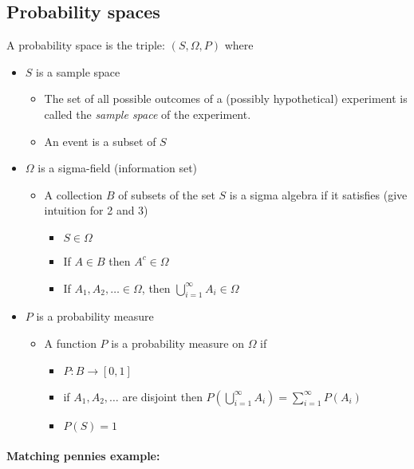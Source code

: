 \subsection{Probability spaces}
\label{sec-1-2}

     A probability space is the triple: $(S, \Omega, P)$ where
\begin{itemize}
\item $S$ is a sample space
\begin{itemize}
\item The set of all possible outcomes of a (possibly hypothetical)
         experiment is called the \emph{sample space} of the experiment.
\item An event is a subset of $S$
\end{itemize}
\item $\Omega$ is a sigma-field (information set)
\begin{itemize}
\item A collection $B$ of subsets of the set $S$ is a sigma
         algebra if it satisfies (give intuition for 2 and 3)
\begin{itemize}
\item $S \in  \Omega$
\item If $A \in  B$ then $A^c \in  \Omega$
\item If $A_1, A_2, \dots \in  \Omega$, then $\bigcup_{i=1}^\infty A_i
           \in  \Omega$
\end{itemize}
\end{itemize}
\item $P$ is a probability measure
\begin{itemize}
\item A function $P$ is a probability measure on $\Omega$ if
\begin{itemize}
\item $P:  B \to [0,1]$
\item if $A_1,A_2,\dots$ are disjoint then $P(\bigcup_{i=1}^\infty
           A_i) = \sum_{i=1}^\infty P(A_i)$
\item $P(S) = 1$
\end{itemize}
\end{itemize}
\end{itemize}

\paragraph{Matching pennies example:}
\label{sec-1-2-1}

